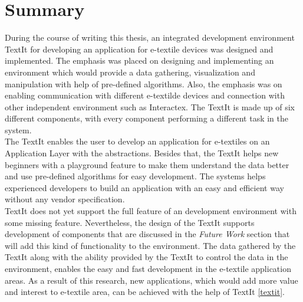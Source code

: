 \section{Summary}

During the course of writing this thesis, an integrated development environment TextIt for developing an application for e-textile devices was designed and implemented. The emphasis was placed on designing and implementing an environment which would provide a data gathering, visualization and manipulation with help of pre-defined algorithms. Also, the emphasis was on enabling communication with different e-textilde devices and connection with other independent environment such as Interactex. The TextIt is made up of six different components, with every component performing a different task in the system.  \\ 

The TextIt enables the user to develop an application for e-textiles on an Application Layer with the abstractions. Besides that, the TextIt helps new beginners with a playground feature to make them understand the data better and use pre-defined algorithms for easy development. The systems helps experienced developers to build an application with an easy and efficient way without any vendor specification. \\

TextIt does not yet support the full feature of an development environment with some missing feature. Nevertheless, the design of the TextIt supports development of components that are discussed in the \textit{Future Work} section that will add this kind of functionality to the environment. The data gathered by the TextIt along with the ability provided by the TextIt to control the data in the environment, enables the easy and fast development in the e-textile application areas. As a result of this research, new applications, which would add more value and interest to e-textile area, can be achieved with the help of TextIt \ref{textit}.
	

